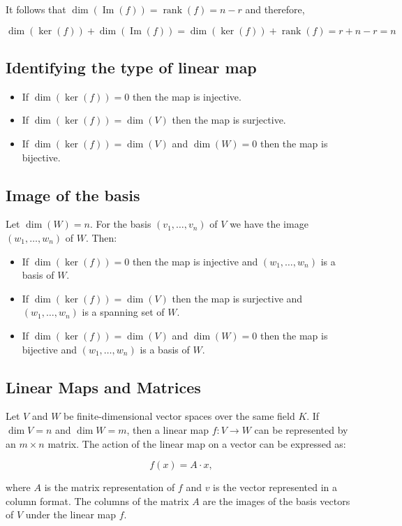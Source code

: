 It follows that \(\dim(\operatorname{Im}(f)) = \operatorname{rank}(f) = n - r\) and therefore,
    
\[
    \dim(\ker(f)) + \dim(\operatorname{Im}(f)) = \dim(\ker(f)) + \operatorname{rank}(f) = r + n - r = n
\]

\QED
  
\subsection{Identifying the type of linear map}

\begin{itemize} 
    
    \item If \(\dim(\ker(f)) = 0\) then the map is injective.
    
    \item If \(\dim(\ker(f)) = \dim(V)\) then the map is surjective.

    \item If \(\dim(\ker(f)) = \dim(V)\) and \(\dim(W) = 0\) then the map is bijective.

\end{itemize}

\subsection{Image of the basis}

Let \(\dim(W) = n\). For the basis \((v_1, \dots, v_n)\) of \(V\) we have the image \((w_1, \dots, w_n)\) 
of \(W\). Then:

\begin{itemize}

    \item If \(\dim(\ker(f)) = 0\) then the map is injective and \((w_1, \dots, w_n)\) is a basis of \(W\).    

    \item If \(\dim(\ker(f)) = \dim(V)\) then the map is surjective and \((w_1, \dots, w_n)\) is a spanning set of \(W\).

    \item If \(\dim(\ker(f)) = \dim(V)\) and \(\dim(W) = 0\) then the map is bijective and \((w_1, \dots, w_n)\) is a 
          basis of \(W\).

\end{itemize}

\subsection{Linear Maps and Matrices}

Let \( V \) and \( W \) be finite-dimensional vector spaces over the same field \( K \). 
If \( \dim V = n \) and \( \dim W = m \), then a linear map \( f: V \to W \) can be represented by 
an \( m \times n \) matrix. The action of the linear map on a vector can be expressed as:

\[
    f(x) = A \cdot x,
\]

where \(A\) is the matrix representation of \(f\) and \( v \) is the vector represented in a column 
format. The columns of the matrix \(A\) are the images of the basis vectors of \( V \) under the linear 
map \(f\).


